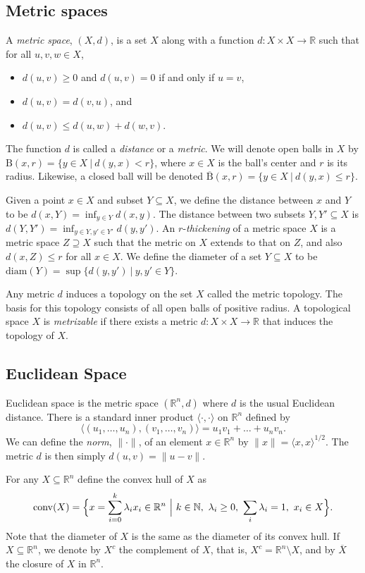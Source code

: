 \documentclass{amsart}
\theoremstyle{plain}
\theoremstyle{definition}
\theoremstyle{myremark}
\newcommand{\N}{\mathbb{N}}
\newcommand{\R}{\mathbb{R}}
\newcommand{\diam}{\mathrm{diam}}
\newcommand{\conv}{\mathrm{conv}}
\newcommand{\ball}[2]{\mathrm{B}(#1,#2)}
\newcommand{\cball}[2]{\overline{\mathrm{B}}(#1,#2)}
\begin{document}
\subsection{Metric spaces}
A \emph{metric space}, $(X,d)$, is a set $X$ along with a function $d \colon X \times X \to \R$ such that for all $u,v,w \in X$,
\begin{itemize}
\item $d(u,v) \ge 0$ and $d(u,v) = 0$ if and only if $u = v$,
\item $d(u,v) = d(v,u)$, and
\item $d(u,v) \le d(u,w) + d(w,v)$.
\end{itemize}
The function $d$ is called a \emph{distance} or a \emph{metric}.
We will denote open balls in $X$ by $\ball{x}{r}=\{y\in X~|~d(y,x)<r\}$, where $x \in X$ is the ball's center and $r$ is its radius.
Likewise, a closed ball will be denoted $\cball{x}{r}=\{y\in X~|~d(y,x)\le r\}$.

Given a point $x\in X$ and subset $Y\subseteq X$, we define the distance between $x$ and $Y$ to be $d(x,Y)=\inf_{y\in Y}d(x,y)$. The distance between two subsets $Y,Y'\subseteq X$ is $d(Y,Y')=\inf_{y\in Y,y'\in Y'}d(y,y')$. An $r$-\emph{thickening} of a metric space $X$ is a metric space $Z \supseteq X$ such that the metric on $X$ extends to that on $Z$, and also $d(x,Z)\le r$ for all $x\in X$. We define the diameter of a set $Y \subseteq X$ to be $\diam(Y) = \sup\{d(y,y')~|~y,y'\in Y\}$.

Any metric $d$ induces a topology on the set $X$ called the metric topology.
The basis for this topology consists of all open balls of positive radius.
A topological space $X$ is \emph{metrizable} if there exists a metric $d\colon X \times X\to \R$ that induces the topology of $X$.

\subsection{Euclidean Space}
Euclidean space is the metric space $(\R^n,d)$ where $d$ is the usual Euclidean distance.
There is a standard inner product $\langle \cdot , \cdot \rangle$ on $\R^n$ defined by
\[
\langle (u_1,\ldots,u_n) , (v_1,\ldots,v_n) \rangle = u_1v_1+\ldots+u_n v_n.
\]
We can define the \emph{norm}, $\|\cdot \|$, of an element $x \in \R^n$ by $\|x\| = \langle x , x \rangle^{1/2}$.
The metric $d$ is then simply $d(u,v)=\|u - v\|$.

For any $X \subseteq \R^n$ define the convex hull of $X$ as
\[\conv(X) = \Bigl\{ x=\sum_{i = 0}^k \lambda_i x_i \in \R^n~\Big|~ k\in\N,\ \lambda_i \geq 0,\ \sum_{i} \lambda_i = 1,\ x_i\in X \Bigr\}.\]
Note that the diameter of $X$ is the same as the diameter of its convex hull. If $X \subseteq \R^n$, we denote by $X^c$ the complement of $X$, that is, $X^c = \R^n \setminus X$, and by $\overline{X}$ the closure of $X$ in $\R^n$.
\end{document}

